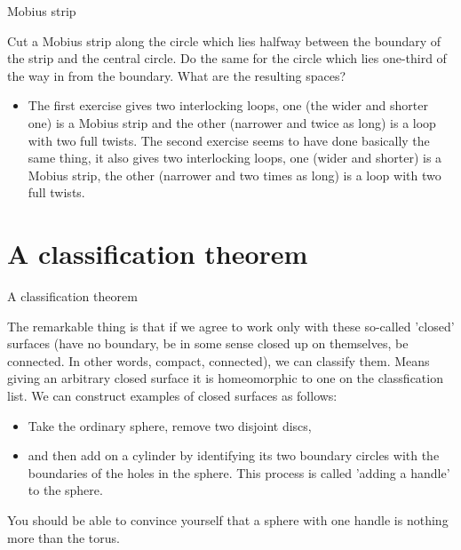 \documentclass{beamer}
\begin{document}
\begin{frame}{Mobius strip}
  \begin{block}{}
    Cut a Mobius strip along the circle which lies halfway between the boundary of the strip and the central circle. Do the same for the circle which lies one-third of the way in from the boundary. What are the resulting spaces?
    \begin{itemize}
    \item The first exercise gives two interlocking loops, one (the wider and shorter one) is a Mobius strip and the other (narrower and twice as long) is a loop with two full twists. The second exercise seems to have done basically the same thing, it also gives two interlocking loops, one (wider and shorter) is a Mobius strip, the other (narrower and two times as long) is a loop with two full twists.
    \end{itemize}
  \end{block}
\end{frame}

\section{A classification theorem}

\begin{frame}{A classification theorem}
  \begin{block}{}
    The remarkable thing is that if we agree to work only with these so-called 'closed' surfaces (have no boundary, be in some sense closed up on themselves, be connected. In other words, compact, connected), we can classify them. Means giving an arbitrary closed surface it is homeomorphic to one on the classfication list.
    We can construct examples of closed surfaces as follows:
    \begin{itemize}
    \item Take the ordinary sphere, remove two disjoint discs,
    \item and then add on a cylinder by identifying its two boundary circles with the boundaries of the holes in the sphere.
      This process is called 'adding a handle' to the sphere.
    \end{itemize}
    You should be able to convince yourself that a sphere with one handle is nothing more than the torus.
  \end{block}
\end{frame}
\end{document}
